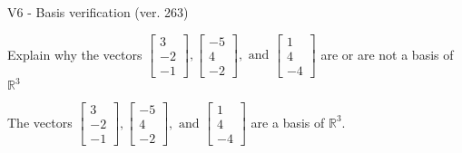 \begin{exercise}
  \begin{exerciseTitle}V6 - Basis verification (ver. 263)\end{exerciseTitle}
  \begin{exerciseStatement}
    Explain why the vectors \(\left[\begin{array}{r}
3 \\
-2 \\
-1
\end{array}\right] , \left[\begin{array}{r}
-5 \\
4 \\
-2
\end{array}\right] , \text{ and } \left[\begin{array}{r}
1 \\
4 \\
-4
\end{array}\right]\) are or are not a basis of \(\mathbb{R}^3\)	


  \end{exerciseStatement}
  \begin{exerciseAnswer}
   The vectors \(\left[\begin{array}{r}
3 \\
-2 \\
-1
\end{array}\right] , \left[\begin{array}{r}
-5 \\
4 \\
-2
\end{array}\right] , \text{ and } \left[\begin{array}{r}
1 \\
4 \\
-4
\end{array}\right]\) 
  	 are  a basis of \(\mathbb{R}^3\).
  


  \end{exerciseAnswer}
\end{exercise}